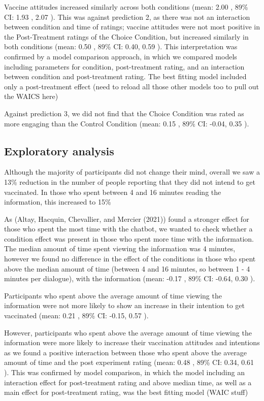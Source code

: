 \documentclass[
  english,
  ,jou,floatsintext]{apa6}
\begin{document}
Vaccine attitudes increased similarly across both conditions (mean: 2.00 , 89\% CI: 1.93 , 2.07 ). This was against prediction 2, as there was not an interaction between condition and time of ratings; vaccine attitudes were not most positive in the Post-Treatment ratings of the Choice Condition, but increased similarly in both conditions (mean: 0.50 , 89\% CI: 0.40, 0.59 ). This interpretation was confirmed by a model comparison approach, in which we compared models including parameters for condition, post-treatment rating, and an interaction between condition and post-treatment rating. The best fitting model included only a post-treatment effect (need to reload all those other models too to pull out the WAICS here)

Against prediction 3, we did not find that the Choice Condition was rated as more engaging than the Control Condition (mean: 0.15 , 89\% CI: -0.04, 0.35 ).

\hypertarget{exploratory-analysis}{%
\subsection{Exploratory analysis}\label{exploratory-analysis}}

Although the majority of participants did not change their mind, overall we saw a 13\% reduction in the number of people reporting that they did not intend to get vaccinated. In those who spent between 4 and 16 minutes reading the information, this increased to 15\%

As (Altay, Hacquin, Chevallier, and Mercier (2021)) found a stronger effect for those who spent the most time with the chatbot, we wanted to check whether a condition effect was present in those who spent more time with the information. The median amount of time spent viewing the information was 4 minutes, however we found no difference in the effect of the conditions in those who spent above the median amount of time (between 4 and 16 minutes, so between 1 - 4 minutes per dialogue), with the information (mean: -0.17 , 89\% CI: -0.64, 0.30 ).

Participants who spent above the average amount of time viewing the information were not more likely to show an increase in their intention to get vaccinated (mean: 0.21 , 89\% CI: -0.15, 0.57 ).

However, participants who spent above the average amount of time viewing the information were more likely to increase their vaccination attitudes and intentions as we found a positive interaction between those who spent above the average amount of time and the post experiment rating (mean: 0.48 , 89\% CI: 0.34, 0.61 ). This was confirmed by model comparison, in which the model including an interaction effect for post-treatment rating and above median time, as well as a main effect for post-treatment rating, was the best fitting model (WAIC stuff)
\end{document}
